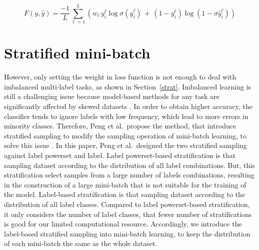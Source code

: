
\begin{equation}
F(y, \hat{y}) = \frac{-1}{L}\sum_{\ell=1}^{L} \left( w_\ell\,y_i^\ell\log\sigma(\hat{y}_i^\ell) \,+\, (1-y_i^\ell)\log(1-\sigma \hat{y}_i^\ell) \right)
\label{eq:weight}
\end{equation}

\section{Stratified mini-batch}
However, only setting the weight in loss function is not enough to deal with imbalanced multi-label tasks, as shown in Section~\ref{strat}. Imbalanced learning is still a challenging issue because model-based methods for any task are significantly affected by skewed datasets \cite{buda2018systematic}. In order to obtain higher accuracy, the classifier tends to ignore labels with low frequency, which lead to more errors in minority classes. Therefore, Peng et al.\ propose the method, that introduce stratified sampling to modify the sampling operation of mini-batch learning, to solve this issue \cite{peng2021addressing}. In this paper, Peng et al.\ designed the two stratified sampling against label powerset and label. Label powerset-based stratification is that sampling dataset according to the distribution of all label combinations. But, this stratification select samples from a large number of labels combinations, resulting in the construction of a large mini-batch that is not suitable for the training of the model. Label-based stratification is that sampling dataset according to the distribution of all label classes. Compared to label powerset-based stratification, it only considers the number of label classes, that fewer number of stratifications is good for our limited computational resource. Accordingly, we introduce the label-based stratified sampling into mini-batch learning, to keep the distribution of each mini-batch the same as the whole dataset.
